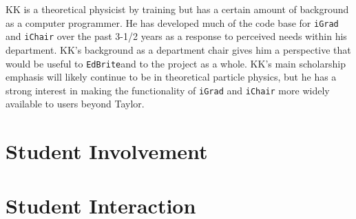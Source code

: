 \documentclass{article}
\newcommand{\igrad}{\texttt{iGrad}}
\newcommand{\ichair}{\texttt{iChair}}
\newcommand{\edbrite}{\texttt{EdBrite}}
\begin{document}
KK is a theoretical physicist by training but has a certain amount
of background as a computer programmer.  He has developed much of
the code base for \igrad{} and \ichair{} over the past 3-1/2 years
as a response to perceived needs within his department.  KK's
background as a department chair gives him a perspective that would
be useful to \edbrite and to the project as a whole.  KK's main
scholarship emphasis will likely continue to be in theoretical
particle physics, but he has a strong interest in making the
functionality of \igrad{} and \ichair{} more widely available to
users beyond Taylor.

\section{Student Involvement}
\label{sec:student-involvement}



\section{Student Interaction}
\label{sec:student-interaction}




\end{document}
